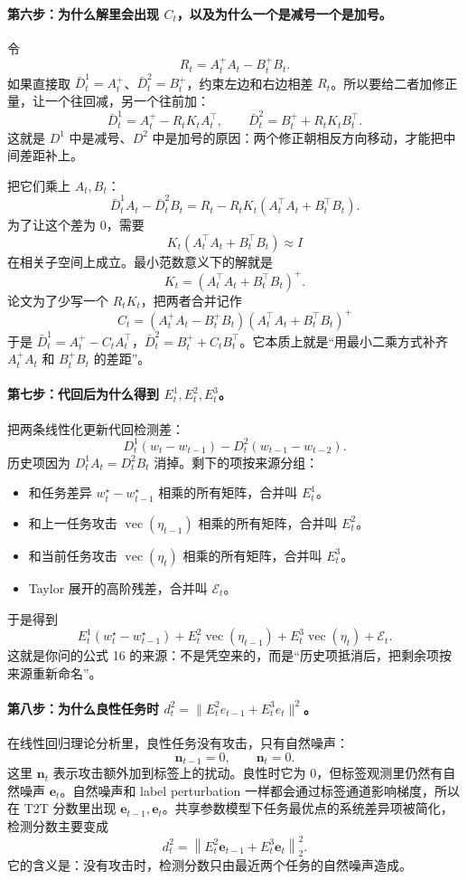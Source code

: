 \documentclass[UTF8,fontset=none,11pt]{ctexart}
\theoremstyle{cnstyle}
\newcommand{\vect}{\operatorname{vec}}
\newcommand{\norm}[1]{\left\lVert #1\right\rVert}
\begin{document}
\paragraph{第六步：为什么解里会出现 \(C_t\)，以及为什么一个是减号一个是加号。}
令
\[
  R_t=A_t^+A_t-B_t^+B_t.
\]
如果直接取 \(\bar D_t^1=A_t^+\)、\(\bar D_t^2=B_t^+\)，约束左边和右边相差 \(R_t\)。所以要给二者加修正量，让一个往回减，另一个往前加：
\[
  \bar D_t^1=A_t^+-R_tK_tA_t^\top,
  \qquad
  \bar D_t^2=B_t^+ +R_tK_tB_t^\top.
\]
这就是 \(D^1\) 中是减号、\(D^2\) 中是加号的原因：两个修正朝相反方向移动，才能把中间差距补上。

把它们乘上 \(A_t,B_t\)：
\[
  \bar D_t^1A_t-\bar D_t^2B_t
  =
  R_t-R_tK_t(A_t^\top A_t+B_t^\top B_t).
\]
为了让这个差为 0，需要
\[
  K_t(A_t^\top A_t+B_t^\top B_t)
  \approx I
\]
在相关子空间上成立。最小范数意义下的解就是
\[
  K_t=(A_t^\top A_t+B_t^\top B_t)^+.
\]
论文为了少写一个 \(R_tK_t\)，把两者合并记作
\[
  C_t=(A_t^+A_t-B_t^+B_t)(A_t^\top A_t+B_t^\top B_t)^+
\]
于是 \(\bar D_t^1=A_t^+-C_tA_t^\top\)，\(\bar D_t^2=B_t^++C_tB_t^\top\)。它本质上就是“用最小二乘方式补齐 \(A_t^+A_t\) 和 \(B_t^+B_t\) 的差距”。

\paragraph{第七步：代回后为什么得到 \(E_t^1,E_t^2,E_t^3\)。}
把两条线性化更新代回检测差：
\[
  D_t^1(w_t-w_{t-1})-D_t^2(w_{t-1}-w_{t-2}).
\]
历史项因为 \(D_t^1A_t=D_t^2B_t\) 消掉。剩下的项按来源分组：
\begin{itemize}
  \item 和任务差异 \(w_t^\star-w_{t-1}^\star\) 相乘的所有矩阵，合并叫 \(E_t^1\)。
  \item 和上一任务攻击 \(\vect(\eta_{t-1})\) 相乘的所有矩阵，合并叫 \(E_t^2\)。
  \item 和当前任务攻击 \(\vect(\eta_t)\) 相乘的所有矩阵，合并叫 \(E_t^3\)。
  \item Taylor 展开的高阶残差，合并叫 \(\mathcal E_t\)。
\end{itemize}
于是得到
\[
  E_t^1(w_t^\star-w_{t-1}^\star)
  +E_t^2\vect(\eta_{t-1})
  +E_t^3\vect(\eta_t)
  +\mathcal E_t.
\]
这就是你问的公式 16 的来源：不是凭空来的，而是“历史项抵消后，把剩余项按来源重新命名”。

\paragraph{第八步：为什么良性任务时 \(d_t^2=\|E_t^2e_{t-1}+E_t^3e_t\|^2\)。}
在线性回归理论分析里，良性任务没有攻击，只有自然噪声：
\[
  \mathbf n_{t-1}=0,\qquad \mathbf n_t=0.
\]
这里 \(\mathbf n_t\) 表示攻击额外加到标签上的扰动。良性时它为 0，但标签观测里仍然有自然噪声 \(\mathbf e_t\)。自然噪声和 label perturbation 一样都会通过标签通道影响梯度，所以在 T2T 分数里出现 \(\mathbf e_{t-1},\mathbf e_t\)。共享参数模型下任务最优点的系统差异项被简化，检测分数主要变成
\[
  d_t^2
  =
  \norm{E_t^2\mathbf e_{t-1}+E_t^3\mathbf e_t}_2^2.
\]
它的含义是：没有攻击时，检测分数只由最近两个任务的自然噪声造成。
\end{document}
